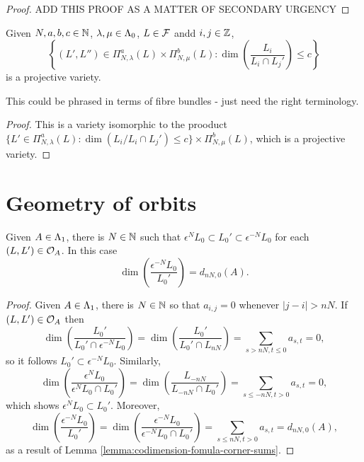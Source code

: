 \documentclass[a4paper, 11pt]{report}
\begin{document}
\begin{proof}
{\color{red}ADD THIS PROOF AS A MATTER OF SECONDARY URGENCY}
\end{proof}

\begin{corollary}
Given $N,a,b,c\in\mathbb{N}$, $\lambda,\mu\in{\Lambda_0}$, $L\in\mathcal{F}$ andd $i,j\in\mathbb{Z}$,
\begin{equation*}
\left\{(L',L'')\in\Pi_{N,\lambda}^a(L)\times\Pi_{N,\mu}^b(L): \dim\left(\frac{L_i}{L_i\cap L_j'}\right)\le c\right\}
\end{equation*}
is a projective variety.
\end{corollary}

{\color{gray}
This could be phrased in terms of fibre bundles - just need the right terminology.
\begin{proof}
This is a variety isomorphic to the prooduct $\{L'\in\Pi_{N,\lambda}^a(L): \dim(L_i/{L_i\cap L_j'})\le c\}\times\Pi_{N,\mu}^b(L)$, which is a projective variety.
\end{proof}
}


\section{Geometry of orbits}

\begin{lemma}\label{lemma:bounded-orbits}
Given $A\in{\Lambda_1}$, there is $N\in\mathbb{N}$ such that $\epsilon^N L_0\subset L_0'\subset \epsilon^{-N}L_0$ for each $(L,L')\in\mathcal{O}_{A}$. In this case
\begin{equation*}
\dim\left(\frac{\epsilon^{-N}L_0}{L_0'}\right) = d_{nN,0}(A).
\end{equation*}
\end{lemma}

\begin{proof}
Given $A\in{\Lambda_1}$, there is $N\in\mathbb{N}$ so that $a_{i,j}=0$ whenever $|j-i|>nN$. If $(L,L')\in\mathcal{O}_{A}$ then
\begin{equation*}
\dim\left(\frac{L_0'}{L_0'\cap\epsilon^{-N}L_0}\right) = \dim\left(\frac{L_0'}{L_0'\cap L_{nN}}\right) = \sum_{s>nN,t\le 0} a_{s,t} = 0,
\end{equation*}
so it follows $L_0'\subset\epsilon^{-N}L_0$. Similarly,
\begin{equation*}
\dim\left(\frac{\epsilon^N L_0}{\epsilon^N L_0\cap L_0'}\right) = \dim\left(\frac{L_{-nN}}{L_{-nN}\cap L_0'}\right) = \sum_{s\le -nN,t>0} a_{s,t} = 0,
\end{equation*}
which shows $\epsilon^N L_0\subset L_0'$. Moreover,
\begin{equation*}
\dim\left(\frac{\epsilon^{-N}L_0}{L_0'}\right) = \dim\left(\frac{\epsilon^{-N}L_0}{\epsilon^{-N}L_0\cap L_0'}\right) = \sum_{s\le nN,t>0}a_{s,t} = d_{nN,0}(A),
\end{equation*}
as a result of Lemma \ref{lemma:codimension-fomula-corner-sums}.
\end{proof}
\end{document}
